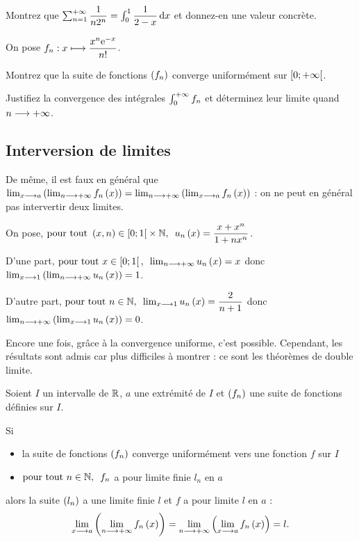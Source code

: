 \begin{exo}~\\
Montrez que \(\sum_{n=1}^{\pinf}\dfrac{1}{n2^n}=\int_0^1\dfrac{1}{2-x}\odif{x}\) et donnez-en une valeur concrète.
\end{exo}

\begin{exo}
On pose \(f_n:x\longmapsto\dfrac{x^n\mathrm{e}^{-x}}{n!}\).

Montrez que la suite de fonctions \(\left(f_n\right)\) converge uniformément sur \(\left[0;+\infty\right[\).

Justifiez la convergence des intégrales \(\int_0^{+\infty}f_n\) et déterminez leur limite quand \(n\longrightarrow+\infty\).
\end{exo}

\subsection{Interversion de limites}

De même, il est faux en général que \(\lim_{x\longrightarrow a}\left(\lim_{n\longrightarrow+\infty}f_n\left(x\right)\right)=\lim_{n\longrightarrow+\infty}\left(\lim_{x\longrightarrow a}f_n\left(x\right)\right)\) : on ne peut en général pas intervertir deux limites.

\begin{ex}
On pose, \(\quantifs{\tpt\paren{x,n}\in\intervie{0}{1}\times\N}u_n\paren{x}=\dfrac{x+x^n}{1+nx^n}\).

D'une part, \(\quantifs{\tpt x\in\intervie{0}{1}}\lim_{n\to\pinf}u_n\paren{x}=x\) donc \(\lim_{x\longrightarrow1}\left(\lim_{n\longrightarrow+\infty}u_n\left(x\right)\right)=1\).

D'autre part, \(\quantifs{\tpt n\in\N}\lim_{x\to1}u_n\paren{x}=\dfrac{2}{n+1}\) donc \(\lim_{n\longrightarrow+\infty}\left(\lim_{x\longrightarrow1}u_n\left(x\right)\right)=0\).
\end{ex}

Encore une fois, grâce à la convergence uniforme, c'est possible. Cependant, les résultats sont admis car plus difficiles à montrer : ce sont les théorèmes de double limite.

\begin{theo}
Soient \(I\) un intervalle de \(\mathbb{R}\), \(a\) une extrémité de \(I\) et \(\left(f_n\right)\) une suite de fonctions définies sur \(I\).

Si

\begin{itemize}
    \item la suite de fonctions \(\left(f_n\right)\) converge uniformément vers une fonction \(f\) sur \(I\) \\
    \item \(\quantifs{\tpt n\in\N}f_n\) a pour limite finie \(l_n\) en \(a\)
\end{itemize}

alors la suite \(\left(l_n\right)\) a une limite finie \(l\) et \(f\) a pour limite \(l\) en \(a\) : \[\lim_{x\longrightarrow a}\left(\lim_{n\longrightarrow+\infty}f_n\left(x\right)\right)=\lim_{n\longrightarrow+\infty}\left(\lim_{x\longrightarrow a}f_n\left(x\right)\right)=l.\]
\end{theo}

